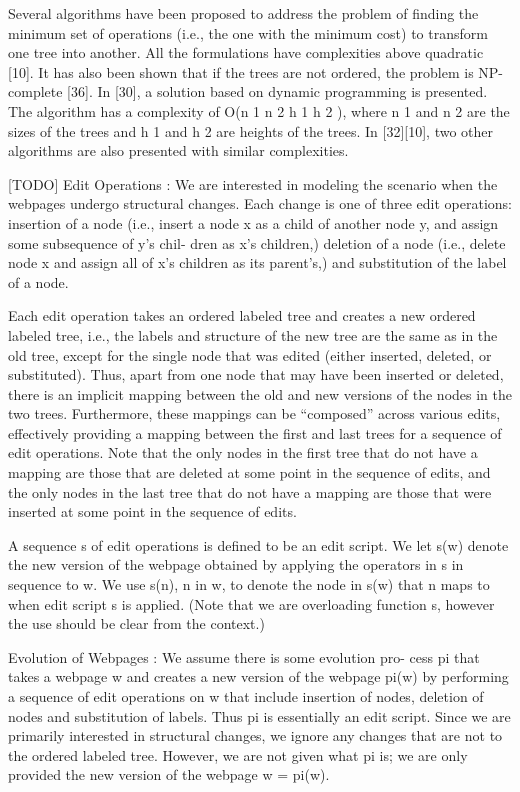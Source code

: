 Several algorithms have been proposed to address the problem of
finding the minimum set of operations (i.e., the one with the
minimum cost) to transform one tree into another. All the
formulations have complexities above quadratic [10]. It has also
been shown that if the trees are not ordered, the problem is NP-
complete [36]. In [30], a solution based on dynamic programming
is presented. The algorithm has a complexity of O(n 1 n 2 h 1 h 2 ),
where n 1 and n 2 are the sizes of the trees and h 1 and h 2 are heights
of the trees. In [32][10], two other algorithms are also presented
with similar complexities.


[TODO] Edit Operations : We are interested in modeling the scenario when
the webpages undergo structural changes. Each change is one of
three edit operations: insertion of a node (i.e., insert a node x as a
child of another node y, and assign some subsequence of y’s chil-
dren as x’s children,) deletion of a node (i.e., delete node x and
assign all of x’s children as its parent’s,) and substitution of the
label of a node.

Each edit operation takes an ordered labeled tree and creates a
new ordered labeled tree, i.e., the labels and structure of the new
tree are the same as in the old tree, except for the single node that
was edited (either inserted, deleted, or substituted). Thus, apart
from one node that may have been inserted or deleted, there is an
implicit mapping between the old and new versions of the nodes
in the two trees. Furthermore, these mappings can be “composed”
across various edits, effectively providing a mapping between the
first and last trees for a sequence of edit operations. Note that the
only nodes in the first tree that do not have a mapping are those
that are deleted at some point in the sequence of edits, and the only
nodes in the last tree that do not have a mapping are those that were
inserted at some point in the sequence of edits.

A sequence s of edit operations is defined to be an edit script.
We let s(w) denote the new version of the webpage obtained by
applying the operators in s in sequence to w. We use s(n), n in w,
to denote the node in s(w) that n maps to when edit script s is
applied. (Note that we are overloading function s, however the use
should be clear from the context.)

Evolution of Webpages : We assume there is some evolution pro-
cess pi that takes a webpage w and creates a new version of the
webpage pi(w) by performing a sequence of edit operations on w
that include insertion of nodes, deletion of nodes and substitution of
labels. Thus pi is essentially an edit script. Since we are primarily
interested in structural changes, we ignore any changes that are not
to the ordered labeled tree. However, we are not given what pi is;
we are only provided the new version of the webpage w = pi(w).

